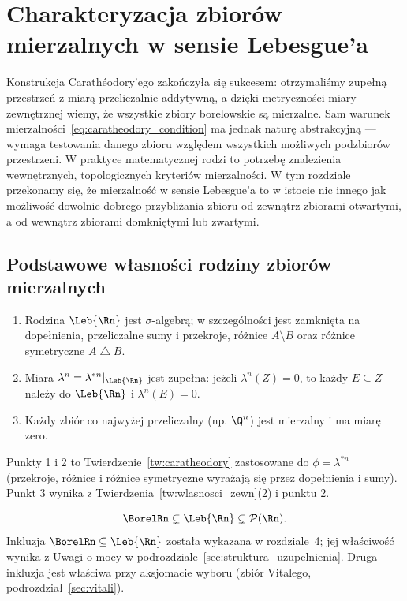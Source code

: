 \section{Charakteryzacja zbiorów mierzalnych w sensie Lebesgue'a}

Konstrukcja Carathéodory'ego zakończyła się sukcesem: otrzymaliśmy zupełną przestrzeń z miarą przeliczalnie addytywną, a dzięki metryczności miary zewnętrznej wiemy, że wszystkie zbiory borelowskie są mierzalne. Sam warunek mierzalności~\eqref{eq:caratheodory_condition} ma jednak naturę abstrakcyjną — wymaga testowania danego zbioru względem wszystkich możliwych podzbiorów przestrzeni. W praktyce matematycznej rodzi to potrzebę znalezienia wewnętrznych, topologicznych kryteriów mierzalności. W tym rozdziale przekonamy się, że mierzalność w sensie Lebesgue'a to w istocie nic innego jak możliwość dowolnie dobrego przybliżania zbioru od zewnątrz zbiorami otwartymi, a od wewnątrz zbiorami domkniętymi lub zwartymi.

\subsection{Podstawowe własności rodziny zbiorów mierzalnych}
\begin{tw}\label{tw:wlasnosci_L}
    \leavevmode
    \begin{enumerate}
        \item Rodzina $\Leb{\Rn}$ jest $\sigma$-algebrą; w szczególności jest zamknięta na dopełnienia, przeliczalne sumy i przekroje, różnice $A \setminus B$ oraz różnice symetryczne $A \mathbin{\triangle} B$.
        \item Miara $\lambda^n = \lambda^{*n}|_{\Leb{\Rn}}$ jest zupełna: jeżeli $\lambda^n(Z) = 0$, to każdy $E \subseteq Z$ należy do $\Leb{\Rn}$ i $\lambda^n(E) = 0$.
        \item Każdy zbiór co najwyżej przeliczalny (np. $\Q^n$) jest mierzalny i ma miarę zero.
    \end{enumerate}
\end{tw}
\begin{dow}
    Punkty 1 i 2 to Twierdzenie~\ref{tw:caratheodory} zastosowane do $\phi = \lambda^{*n}$ (przekroje, różnice i różnice symetryczne wyrażają się przez dopełnienia i sumy). Punkt 3 wynika z Twierdzenia~\ref{tw:wlasnosci_zewn}(2) i punktu 2.
\end{dow}

\begin{fakt}
    \[
        \BorelRn \subsetneq \Leb{\Rn} \subsetneq \mathcal{P}(\Rn).
    \]
    Inkluzja $\BorelRn \subseteq \Leb{\Rn}$ została wykazana w rozdziale~4; jej właściwość wynika z Uwagi o mocy w podrozdziale~\ref{sec:struktura_uzupelnienia}. Druga inkluzja jest właściwa przy aksjomacie wyboru (zbiór Vitalego, podrozdział~\ref{sec:vitali}).
\end{fakt}

